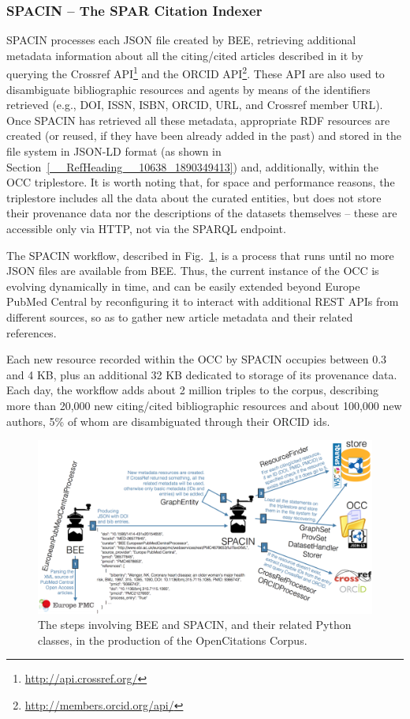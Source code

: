 \documentclass[runningheads,a4paper]{llncs}
\makeatletter
\def\maxwidth#1{\ifdim\Gin@nat@width>#1 #1\else\Gin@nat@width\fi}
\makeatother
\begin{document}
\subsubsection{SPACIN -- The SPAR Citation Indexer}

SPACIN processes each JSON file created by BEE, retrieving additional metadata information about all the citing/cited articles described in it by querying the Crossref API\footnote{\url{http://api.crossref.org/}} and the ORCID API\footnote{\url{http://members.orcid.org/api/}}. These API are also used to disambiguate bibliographic resources and agents by means of the identifiers retrieved (e.g., DOI, ISSN, ISBN, ORCID, URL, and Crossref member URL). Once SPACIN has retrieved all these metadata, appropriate RDF resources are created (or reused, if they have been already added in the past) and stored in the file system in JSON-LD format (as shown in Section~\ref{__RefHeading__10638_1890349413}) and, additionally, within the OCC triplestore. It is worth noting that, for space and performance reasons, the triplestore includes all the data about the curated entities, but does not store their provenance data nor the descriptions of the datasets themselves -- these are accessible only via HTTP, not via the SPARQL endpoint.

The SPACIN workflow, described in Fig.~\ref{refIllustration0}, is a process that runs until no more JSON files are available from BEE. Thus, the current instance of the OCC is evolving dynamically in time, and can be easily extended beyond Europe PubMed Central by reconfiguring it to interact with additional REST APIs from different sources, so as to gather new article metadata and their related references.

Each new resource recorded within the OCC by SPACIN occupies between 0.3 and 4 KB, plus an additional 32 KB dedicated to storage of its provenance data. Each day, the workflow adds about 2 million triples to the corpus, describing more than 20,000 new citing/cited bibliographic resources and about 100,000 new authors, 5\% of whom are disambiguated through their ORCID ids.
\begin{figure}[h!]
\centering
\includegraphics[width=\maxwidth{\textwidth}]{img/1000020100000948000004D0192123CB.png}
\cprotect\caption{The steps involving BEE and SPACIN, and their related Python classes, in the production of the OpenCitations Corpus.}
\label{refIllustration0}
\end{figure}
\end{document}
